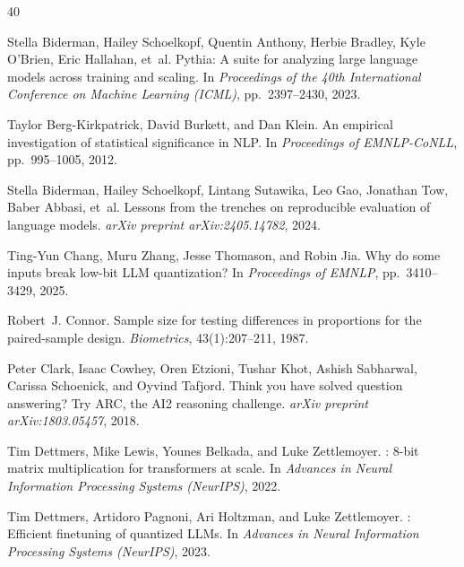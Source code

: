 \documentclass{article}
\begin{document}
\begin{thebibliography}{40}

Stella Biderman, Hailey Schoelkopf, Quentin Anthony, Herbie Bradley, Kyle O'Brien, Eric Hallahan, et~al.
\newblock Pythia: A suite for analyzing large language models across training and scaling.
\newblock In \emph{Proceedings of the 40th International Conference on Machine Learning (ICML)}, pp.\ 2397--2430, 2023.

Taylor Berg-Kirkpatrick, David Burkett, and Dan Klein.
\newblock An empirical investigation of statistical significance in {NLP}.
\newblock In \emph{Proceedings of EMNLP-CoNLL}, pp.\ 995--1005, 2012.

Stella Biderman, Hailey Schoelkopf, Lintang Sutawika, Leo Gao, Jonathan Tow, Baber Abbasi, et~al.
\newblock Lessons from the trenches on reproducible evaluation of language models.
\newblock \emph{arXiv preprint arXiv:2405.14782}, 2024.

Ting-Yun Chang, Muru Zhang, Jesse Thomason, and Robin Jia.
\newblock Why do some inputs break low-bit {LLM} quantization?
\newblock In \emph{Proceedings of EMNLP}, pp.\ 3410--3429, 2025.

Robert~J. Connor.
\newblock Sample size for testing differences in proportions for the paired-sample design.
\newblock \emph{Biometrics}, 43(1):207--211, 1987.

Peter Clark, Isaac Cowhey, Oren Etzioni, Tushar Khot, Ashish Sabharwal, Carissa Schoenick, and Oyvind Tafjord.
\newblock Think you have solved question answering? {Try ARC}, the {AI2} reasoning challenge.
\newblock \emph{arXiv preprint arXiv:1803.05457}, 2018.

Tim Dettmers, Mike Lewis, Younes Belkada, and Luke Zettlemoyer.
: 8-bit matrix multiplication for transformers at scale.
\newblock In \emph{Advances in Neural Information Processing Systems (NeurIPS)}, 2022.

Tim Dettmers, Artidoro Pagnoni, Ari Holtzman, and Luke Zettlemoyer.
: Efficient finetuning of quantized {LLM}s.
\newblock In \emph{Advances in Neural Information Processing Systems (NeurIPS)}, 2023.


\end{thebibliography}
\end{document}
